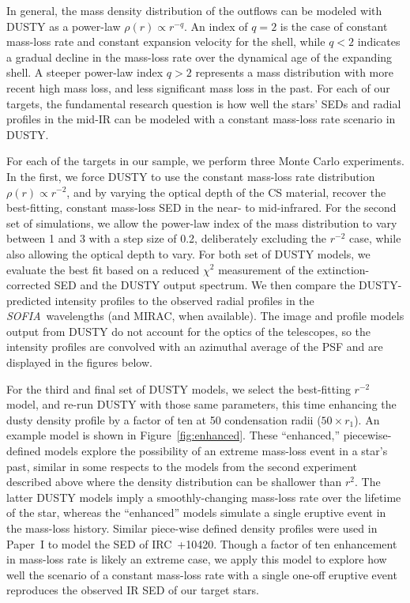 \documentclass[modern]{aastex61}
\newcommand{\SOFIA}{{\it SOFIA}}
\begin{document}
In general, the mass density distribution of the outflows can be modeled with DUSTY as a power-law $\rho\left(r\right)\propto r^{-q}$.  An index of $q=2$ is the case of constant mass-loss rate and constant expansion velocity for the shell, while $q<2$ indicates a gradual decline in the mass-loss rate over the dynamical age of the expanding shell.  A steeper power-law index $q>2$ represents a mass distribution with more recent high mass loss, and less significant mass loss in the past.  For each of our targets, the fundamental research question is how well the stars' SEDs and radial profiles in the mid-IR can be modeled with a constant mass-loss rate scenario in DUSTY.

For each of the targets in our sample, we perform three Monte Carlo experiments.  In the first, we force DUSTY to use the constant mass-loss rate distribution $\rho\left(r\right)\propto r^{-2}$, and by varying the optical depth of the CS material, recover the best-fitting, constant mass-loss SED in the near- to mid-infrared.  For the second set of simulations, we allow the power-law index of the mass distribution to vary between 1 and 3 with a step size of 0.2, deliberately excluding the $r^{-2}$ case, while also allowing the optical depth to vary.  For both set of DUSTY models, we evaluate the best fit based on a reduced $\chi^2$ measurement of the extinction-corrected SED and the DUSTY output spectrum.  We then compare the DUSTY-predicted intensity profiles to the observed radial profiles in the \SOFIA\ wavelengths (and MIRAC, when available).  The image and profile models output from DUSTY do not account for the optics of the telescopes, so the intensity profiles are convolved with an azimuthal average of the PSF and are displayed in the figures below.

For the third and final set of DUSTY models, we select the best-fitting $r^{-2}$ model, and re-run DUSTY with those same parameters, this time enhancing the dusty density profile by a factor of ten at 50 condensation radii ($50\times r_1$). An example model is shown in Figure~\ref{fig:enhanced}.  These ``enhanced,'' piecewise-defined models explore the possibility of an extreme mass-loss event in a star's past, similar in some respects to the models from the second experiment described above where the density distribution can be shallower than $r^2$. The latter DUSTY models imply a smoothly-changing mass-loss rate over the lifetime of the star, whereas the ``enhanced'' models simulate a single eruptive event in the mass-loss history. Similar piece-wise defined density profiles were used in Paper~I to model the SED of IRC~+10420. Though a factor of ten enhancement in mass-loss rate is likely an extreme case, we apply this model to explore how well the scenario of a constant mass-loss rate with a single one-off eruptive event reproduces the observed IR SED of our target stars.
\end{document}
